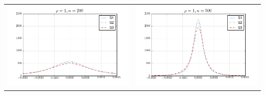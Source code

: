 \begin{table}[!ht]
{\begin{tabular}{c c}
\includegraphics[width=8cm]{beta2_density_200_1} & \includegraphics[width=8cm]{beta2_density_500_1} \\
\end{tabular}
}
\end{table}




